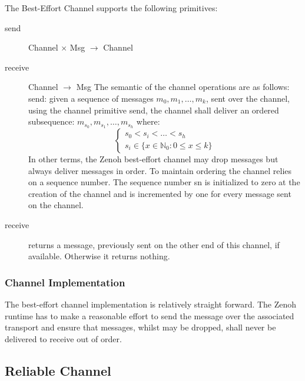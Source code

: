 \documentclass[a4paper,oneside,article]{memoir}
\begin{document}
The Best-Effort Channel supports the following primitives:
\begin{description}
\item[send] Channel $\times$ Msg $\rightarrow$ Channel
\item[receive] Channel $\rightarrow$ Msg The semantic of the channel operations are as follows:
  send: given a sequence of messages $m_0, m_1, \ldots{}, m_k$, sent over the channel, using the
  channel primitive send, the channel shall deliver an ordered subsequence:
  $m_{s_0},m_{s_1}, \ldots{} ,m_{s_h}$ where:
  \[
    \left.
      \begin{cases}
        s_0 < s_i < \ldots{} < s_h \\
        s_i \in \{ x \in \mathbb{N}_0 : 0 \leq x \leq k \}
      \end{cases}
    \right.
  \]
  In other terms, the Zenoh best-effort channel may drop messages but always deliver messages in
  order. To maintain ordering the channel relies on a sequence number. The sequence number sn is
  initialized to zero at the creation of the channel and is incremented by one for every message
  sent on the channel.
\item[receive] returns a message, previously sent on the other end of this channel, if
  available. Otherwise it returns nothing.
\end{description}

\subsubsection{Channel Implementation}

The best-effort channel implementation is relatively straight forward. The Zenoh runtime has to make
a reasonable effort to send the message over the associated transport and ensure that messages,
whilst may be dropped, shall never be delivered to receive out of order.

\subsection{Reliable Channel}
\end{document}
